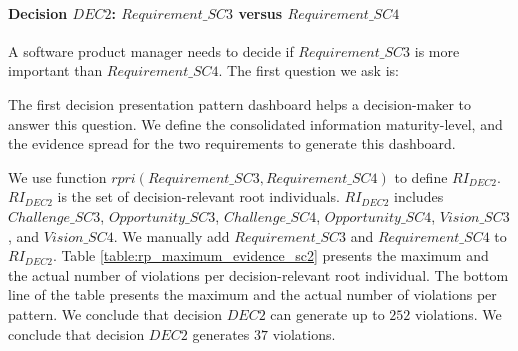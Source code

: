 
\paragraph{Decision $DEC2$: $Requirement\_SC3$ versus $Requirement\_SC4$}
A software product manager needs to decide if $Requirement\_SC3$ is more important than $Requirement\_SC4$. The first question we ask is:

\begin{center}
\large\color{document}{Is the information ready for this decision?}
\end{center}

The first decision presentation pattern dashboard helps a decision-maker to answer this question. We define the consolidated information maturity-level, and the evidence spread for the two requirements to generate this dashboard. 

We use function $rpri(Requirement\_SC3,Requirement\_SC4)$ to define $RI_{DEC2}$. $RI_{DEC2}$ is the set of decision-relevant root individuals. $RI_{DEC2}$ includes $Challenge\_SC3$, $Opportunity\_SC3$, $Challenge\_SC4$, $Opportunity\_SC4$, $Vision\_SC3$, and $Vision\_SC4$. We manually add $Requirement\_SC3$ and $Requirement\_SC4$ to $RI_{DEC2}$. Table \ref{table:rp_maximum_evidence_sc2} presents the maximum and the actual number of violations per decision-relevant root individual. The bottom line of the table presents the maximum and the actual number of violations per pattern. We conclude that decision $DEC2$ can generate up to $252$ violations. We conclude that decision $DEC2$ generates $37$ violations.

